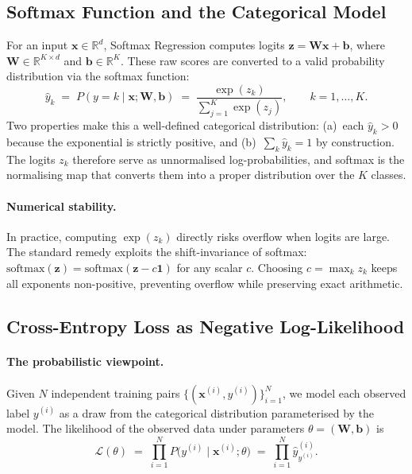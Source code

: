 \documentclass[11pt]{article}
\newcommand{\R}{\mathbb{R}}
\newcommand{\bx}{\mathbf{x}}
\newcommand{\bz}{\mathbf{z}}
\newcommand{\bW}{\mathbf{W}}
\newcommand{\bb}{\mathbf{b}}
\newcommand{\bone}{\mathbf{1}}
\begin{document}
\subsection{Softmax Function and the Categorical Model}

For an input $\bx\in\R^d$, Softmax Regression computes logits $\bz = \bW\bx + \bb$, where
$\bW\in\R^{K\times d}$ and $\bb\in\R^K$.  These raw scores are converted to a valid
probability distribution via the softmax function:
\begin{equation}\label{eq:softmax}
  \hat{y}_k \;=\; P(y{=}k\mid\bx;\bW,\bb)
  \;=\; \frac{\exp(z_k)}{\displaystyle\sum_{j=1}^{K}\exp(z_j)},
  \qquad k=1,\dots,K.
\end{equation}
Two properties make this a well-defined categorical distribution:
(a)~each $\hat{y}_k > 0$ because the exponential is strictly positive, and
(b)~$\sum_k \hat{y}_k = 1$ by construction.
The logits $z_k$ therefore serve as unnormalised log-probabilities, and softmax is the
normalising map that converts them into a proper distribution over the $K$ classes.

\paragraph{Numerical stability.}
In practice, computing $\exp(z_k)$ directly risks overflow when logits are large.
The standard remedy exploits the shift-invariance of softmax:
$\mathrm{softmax}(\bz) = \mathrm{softmax}(\bz - c\bone)$ for any scalar $c$.
Choosing $c = \max_k z_k$ keeps all exponents non-positive, preventing overflow
while preserving exact arithmetic.

\subsection{Cross-Entropy Loss as Negative Log-Likelihood}
\label{sec:nll}

\paragraph{The probabilistic viewpoint.}
Given $N$ independent training pairs $\{(\bx^{(i)},y^{(i)})\}_{i=1}^{N}$, we model
each observed label $y^{(i)}$ as a draw from the categorical distribution parameterised
by the model.  The likelihood of the observed data under parameters $\theta=(\bW,\bb)$ is
\begin{equation}\label{eq:likelihood}
  \mathcal{L}(\theta)
  \;=\;\prod_{i=1}^{N} P\!\bigl(y^{(i)}\mid\bx^{(i)};\theta\bigr)
  \;=\;\prod_{i=1}^{N} \hat{y}_{y^{(i)}}^{(i)}.
\end{equation}
\end{document}
